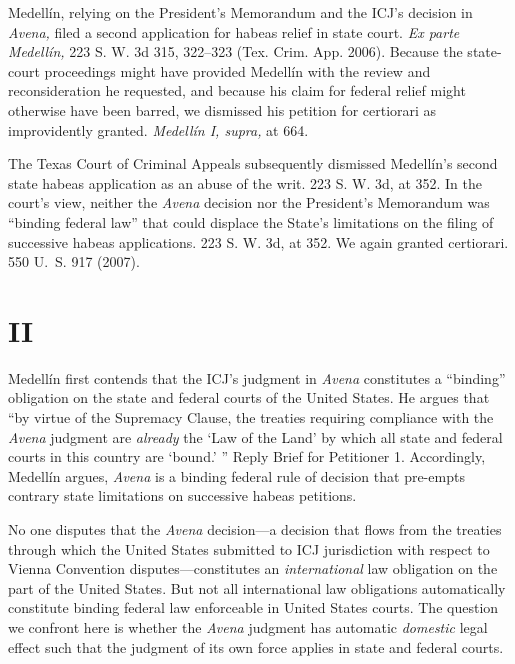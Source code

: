 {{  Medellín, relying on the President's Memorandum and the ICJ's
decision in \emph{Avena,} filed a second application for habeas relief
in state court. \emph{Ex parte Medellín,} 223 S. W. 3d 315, 322--323
(Tex. Crim. App. 2006). Because the state-court proceedings might have
provided Medellín with the review and reconsideration he requested, and
because his claim for federal relief might otherwise have been barred,
we dismissed his petition for certiorari as improvidently granted.
\emph{Medellín I, supra,} at 664.\newpage 

  The Texas Court of Criminal Appeals subsequently dismissed
Medellín's second state habeas application as an abuse of the writ.
223 S. W. 3d, at 352. In the court's view, neither the \emph{Avena}
decision nor the President's Memorandum was ``binding federal
law'' that could displace the State's limitations on the filing of
successive habeas applications. 223 S. W. 3d, at 352. We again
granted certiorari. 550 U.~S. 917 (2007).

\section{II}

  Medellín first contends that the ICJ's judgment in \emph{Avena}
constitutes a ``binding'' obligation on the state and federal courts
of the United States. He argues that ``by virtue of the Supremacy
Clause, the treaties requiring compliance with the \emph{Avena} judgment
are \emph{already} the ‘Law of the Land' by which all state and federal
courts in this country are ‘bound.' '' Reply Brief for Petitioner
1. Accordingly, Medellín argues, \emph{Avena} is a binding federal rule of
decision that pre-empts contrary state limitations on successive habeas
petitions.

  No one disputes that the \emph{Avena} decision---a decision that flows
from the treaties through which the United States submitted to ICJ
jurisdiction with respect to Vienna Convention disputes---constitutes
an \emph{international} law obligation on the part of the United States.
But not all international law obligations automatically constitute
binding federal law enforceable in United States courts. The question
we confront here is whether the \emph{Avena} judgment has automatic
\emph{domestic} legal effect such that the judgment of its own force
applies in state and federal courts.

}}
